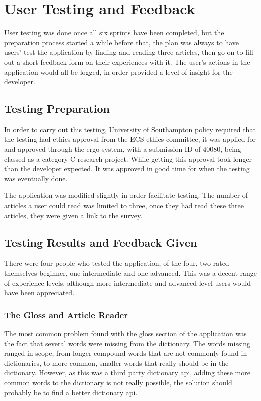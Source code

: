 \chapter{User Testing and Feedback}

User testing was done once all six sprints have been completed, but the preparation process started a while before that, the plan was always to have users' test the application by finding and reading three articles, then go on to fill out a short feedback form on their experiences with it. The user's actions in the application would all be logged, in order provided a level of insight for the developer. 

\section{Testing Preparation}

In order to carry out this testing, University of Southampton policy required that the testing had ethics approval from the ECS ethics committee, it was applied for and approved through the ergo system, with a submission ID of 40080, being classed as a category C research project. While getting this approval took longer than the developer expected. It was approved in good time for when the testing was eventually done.

The application was modified slightly in order facilitate testing. The number of articles a user could read was limited to three, once they had read these three articles, they were given a link to the survey.

\section{Testing Results and Feedback Given}

There were four people who tested the application, of the four, two rated themselves beginner, one intermediate and one advanced. This was a decent range of experience levels, although more intermediate and advanced level users would have been appreciated.


\subsection{The Gloss and Article Reader}

The most common problem found with the gloss section of the application was the fact that several words were missing from the dictionary. The words missing ranged in scope, from longer compound words that are not commonly found in dictionaries, to more common, smaller words that really should be in the dictionary. However, as this was a third party dictionary api, adding these more common words to the dictionary is not really possible, the solution should probably be to find a better dictionary api.

